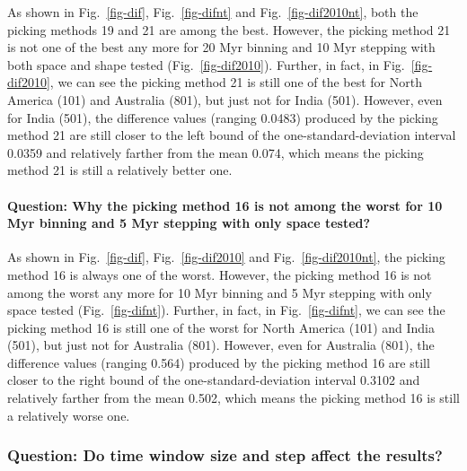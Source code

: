 As shown in Fig.~\ref{fig-dif}, Fig.~\ref{fig-difnt} and
Fig.~\ref{fig-dif2010nt}, both the picking methods 19 and 21 are among the
best. However, the picking method 21 is not one of the best any more for 20 Myr
binning and 10 Myr stepping with both space and shape tested
(Fig.~\ref{fig-dif2010}). Further, in fact, in Fig.~\ref{fig-dif2010}, we can
see the picking method 21 is still one of the best for North America (101) and
Australia (801), but just not for India (501). However, even for India (501),
the difference values (ranging 0.0483) produced by the picking
method 21 are still closer to the left bound of the one-standard-deviation
interval 0.0359 and relatively farther from the mean 0.074,
which means the picking method 21 is still a relatively better one.

\paragraph{Question: Why the picking method 16 is not among the worst for 10 Myr
binning and 5 Myr stepping with only space tested?}

As shown in Fig.~\ref{fig-dif}, Fig.~\ref{fig-dif2010} and
Fig.~\ref{fig-dif2010nt}, the picking method 16 is always one of the worst.
However, the picking method 16 is not among the worst any more for 10 Myr
binning and 5 Myr stepping with only space tested (Fig.~\ref{fig-difnt}).
Further, in fact, in Fig.~\ref{fig-difnt}, we can see the picking method 16 is
still one of the worst for North America (101) and India (501), but just not for
Australia (801). However, even for Australia (801), the difference values
(ranging 0.564) produced by the picking method 16 are still
closer to the right bound of the one-standard-deviation interval
0.3102 and relatively farther from the mean 0.502, which means
the picking method 16 is still a relatively worse one.

\subsubsection{Question: Do time window size and step affect the results?}

